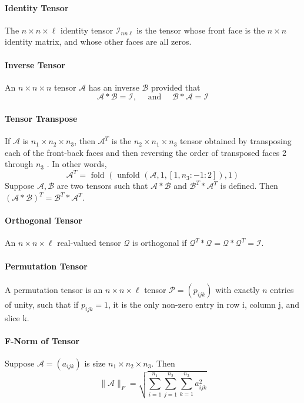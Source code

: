 \documentclass[english]{article}
\newcommand{\<}{\langle}
\renewcommand{\>}{\rangle}
\theoremstyle{definition}
\begin{document}
\paragraph{Identity Tensor} The  $n \times n \times \ell$  identity tensor  $\mathcal{I}_{n n \ell}$  is the tensor whose front face is the  $n \times n$  identity matrix, and whose other faces are all zeros.
\paragraph{Inverse Tensor} An  $n \times n \times n$  tensor  $\mathcal{A}$  has an inverse  $\mathcal{B}$  provided that
$$\mathcal{A} * \mathcal{B}=\mathcal{I}, \quad \text { and } \quad \mathcal{B} * \mathcal{A}=\mathcal{I}$$
\paragraph{Tensor Transpose} If  $\mathcal{A}$  is  $n_{1} \times n_{2} \times n_{3}$,  then  $\mathcal{A}^{T}$  is the $ n_{2} \times n_{1} \times n_{3}$  tensor obtained by transposing each of the front-back faces and then reversing the order of transposed faces 2 through  $n_{3}$ . In other words,
$$\mathcal{A}^{T}=\text { fold }\left(\text { unfold }\left(\mathcal{A}, 1,\left[1, n_{3}:-1: 2\right]\right), 1\right)$$
   Suppose  $\mathcal{A}, \mathcal{B}$  are two tensors such that  $\mathcal{A} * \mathcal{B}$  and  $\mathcal{B}^{T} * \mathcal{A}^{T}$  is defined. Then  $(\mathcal{A} * \mathcal{B})^{T}=\mathcal{B}^{T} * \mathcal{A}^{T}$.
\paragraph{Orthogonal Tensor} An $ n \times n \times \ell $ real-valued tensor $ \mathcal{Q} $ is orthogonal if $ \mathcal{Q}^{T} * \mathcal{Q}= \mathcal{Q} * \mathcal{Q}^{T}=\mathcal{I}$.
\paragraph{Permutation Tensor} A permutation tensor is an $ n \times n \times \ell $ tensor  $\mathcal{P}=\left(p_{i j k}\right)$  with exactly $ n $ entries of unity, such that if  $p_{i j k}=1$,  it is the only non-zero entry in row i, column j, and slice k.
\paragraph{F-Norm of Tensor} Suppose $\mathcal{A}=\left(a_{i j k}\right)$ is size $ n_{1} \times n_{2} \times n_{3} $.  Then
$$ \|\mathcal{A}\|_{F}=\sqrt{\sum_{i=1}^{n_{1}} \sum_{j=1}^{n_{2}} \sum_{k=1}^{n_{3}} a_{i j k}^{2}} $$
\end{document}
